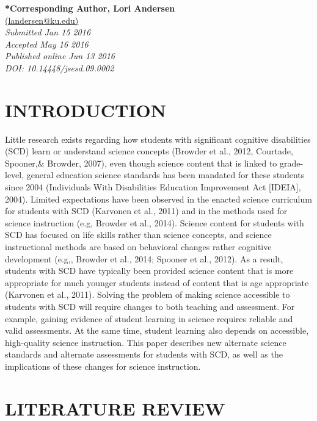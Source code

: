 \documentclass[11.5pt]{sig-alternate} %
\begin{document}
\textbf{*Corresponding Author, Lori Andersen}\\
\href{mailto:  landersen@ku.edu}{(landersen@ku.edu)} \\
\textit{Submitted  Jan 15 2016 }\\
\textit{Accepted May 16 2016} \\
\textit{Published online Jun 13 2016} \\
\textit{DOI: 10.14448/jsesd.09.0002} \\
\pagebreak
\clearpage
\begin{large}
   
\section*{INTRODUCTION}

Little research exists regarding how students with significant cognitive disabilities (SCD) learn or understand science concepts (Browder et al., 2012, Courtade, Spooner,\& Browder, 2007), even though science content that is linked to grade-level, general education science standards has been mandated for these students since 2004 (Individuals With Disabilities Education Improvement Act [IDEIA], 2004). Limited expectations have been observed in the enacted science curriculum for students with SCD (Karvonen et al., 2011) and in the methods used for science instruction (e.g, Browder et al., 2014). Science content for students with SCD has focused on life skills rather than science concepts, and science instructional methods are based on behavioral changes rather cognitive development (e.g,, Browder et al., 2014; Spooner et al., 2012). As a result, students with SCD have typically been provided science content that is more appropriate for much younger students instead of content that is age appropriate (Karvonen et al., 2011). Solving the problem of making science accessible to students with SCD will require changes to both teaching and assessment. For example, gaining evidence of student learning in science requires reliable and valid assessments. At the same time, student learning also depends on accessible, high-quality science instruction. This paper describes new alternate science standards and alternate assessments for students with SCD, as well as the implications of these changes for science instruction. 

\section*{LITERATURE REVIEW}


\end{large}
\end{document}
